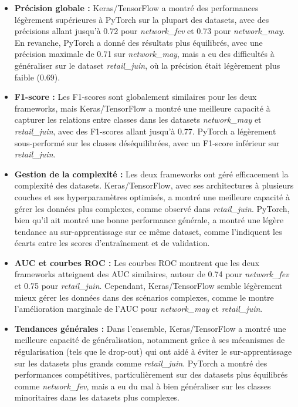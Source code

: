 \begin{itemize}
    \item \textbf{Précision globale :} Keras/TensorFlow a montré des performances légèrement supérieures à PyTorch sur la plupart des datasets, avec des précisions allant jusqu'à 0.72 pour \textit{network\_fev} et 0.73 pour \textit{network\_may}. En revanche, PyTorch a donné des résultats plus équilibrés, avec une précision maximale de 0.71 sur \textit{network\_may}, mais a eu des difficultés à généraliser sur le dataset \textit{retail\_juin}, où la précision était légèrement plus faible (0.69).

    \item \textbf{F1-score :} Les F1-scores sont globalement similaires pour les deux frameworks, mais Keras/TensorFlow a montré une meilleure capacité à capturer les relations entre classes dans les datasets \textit{network\_may} et \textit{retail\_juin}, avec des F1-scores allant jusqu'à 0.77. PyTorch a légèrement sous-performé sur les classes déséquilibrées, avec un F1-score inférieur sur \textit{retail\_juin}.

    \item \textbf{Gestion de la complexité :} Les deux frameworks ont géré efficacement la complexité des datasets. Keras/TensorFlow, avec ses architectures à plusieurs couches et ses hyperparamètres optimisés, a montré une meilleure capacité à gérer les données plus complexes, comme observé dans \textit{retail\_juin}. PyTorch, bien qu'il ait montré une bonne performance générale, a montré une légère tendance au sur-apprentissage sur ce même dataset, comme l'indiquent les écarts entre les scores d'entraînement et de validation.

    \item \textbf{AUC et courbes ROC :} Les courbes ROC montrent que les deux frameworks atteignent des AUC similaires, autour de 0.74 pour \textit{network\_fev} et 0.75 pour \textit{retail\_juin}. Cependant, Keras/TensorFlow semble légèrement mieux gérer les données dans des scénarios complexes, comme le montre l'amélioration marginale de l'AUC pour \textit{network\_may} et \textit{retail\_juin}.

    \item \textbf{Tendances générales :} Dans l'ensemble, Keras/TensorFlow a montré une meilleure capacité de généralisation, notamment grâce à ses mécanismes de régularisation (tels que le drop-out) qui ont aidé à éviter le sur-apprentissage sur les datasets plus grands comme \textit{retail\_juin}. PyTorch a montré des performances compétitives, particulièrement sur des datasets plus équilibrés comme \textit{network\_fev}, mais a eu du mal à bien généraliser sur les classes minoritaires dans les datasets plus complexes.
\end{itemize}

